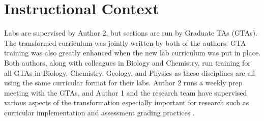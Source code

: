 \documentclass[aip, numerical, preprint]{revtex4-2}
\begin{document}
\section{Instructional Context}


Labs are supervised by Author 2, but sections are run by Graduate TAs (GTAs). The transformed
curriculum was jointly written by both of the authors.  GTA training was also greatly enhanced
when the new lab curriculum was put in place.  Both authors, along with colleagues in Biology
and Chemistry, run training for all GTAs in Biology, Chemistry, Geology, and Physics as these
disciplines are all using the same curricular format for their labs.  Author 2 runs a weekly
prep meeting with the GTAs, and Author 1 and the research team have supervised various aspects
of the transformation especially important for research such as curricular implementation
\citep{SmithJoyner2020} and assessment grading practices \citep{Wolf2019mask}.
\end{document}
